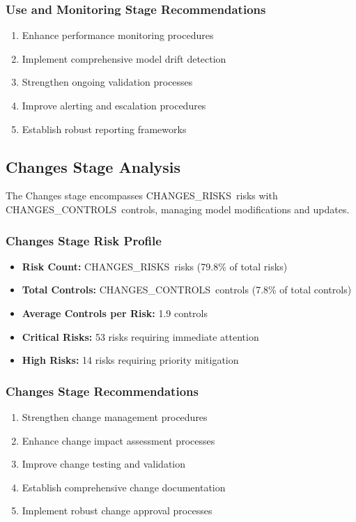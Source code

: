 \documentclass[11pt,a4paper]{article}
\newcommand{\changesrisks}{{{CHANGES_RISKS}}}
\newcommand{\changescontrols}{{{CHANGES_CONTROLS}}}
\begin{document}
\subsubsection{Use and Monitoring Stage Recommendations}
\begin{enumerate}
\item Enhance performance monitoring procedures
\item Implement comprehensive model drift detection
\item Strengthen ongoing validation processes
\item Improve alerting and escalation procedures
\item Establish robust reporting frameworks
\end{enumerate}

\subsection{Changes Stage Analysis}

The Changes stage encompasses \changesrisks\ risks with \changescontrols\ controls, managing model modifications and updates.

\subsubsection{Changes Stage Risk Profile}
\begin{itemize}
\item \textbf{Risk Count:} \changesrisks\ risks (79.8\% of total risks)
\item \textbf{Total Controls:} \changescontrols\ controls (7.8\% of total controls)
\item \textbf{Average Controls per Risk:} 1.9 controls
\item \textbf{Critical Risks:} 53 risks requiring immediate attention
\item \textbf{High Risks:} 14 risks requiring priority mitigation
\end{itemize}

\subsubsection{Changes Stage Recommendations}
\begin{enumerate}
\item Strengthen change management procedures
\item Enhance change impact assessment processes
\item Improve change testing and validation
\item Establish comprehensive change documentation
\item Implement robust change approval processes
\end{enumerate}
\end{document}
